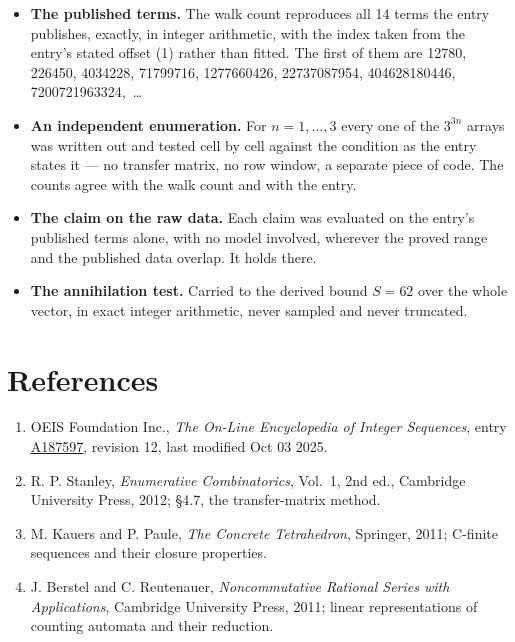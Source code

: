 \documentclass[11pt]{article}
\theoremstyle{definition}
\begin{document}
\begin{itemize}

\item {\bfseries The published terms.} The walk count reproduces all 14 terms the entry publishes, exactly, in integer arithmetic, with the index taken from the entry's stated offset (1) rather than fitted. The first of them are 12780, 226450, 4034228, 71799716, 1277660426, 22737087954, 404628180446, 7200721963324,~\dots

\item {\bfseries An independent enumeration.} For $n = 1,\dots,3$ every one of the $3^{3n}$ arrays was written out and tested cell by cell against the condition as the entry states it --- no transfer matrix, no row window, a separate piece of code. The counts agree with the walk count and with the entry.

\item {\bfseries The claim on the raw data.} Each claim was evaluated on the entry's published terms alone, with no model involved, wherever the proved range and the published data overlap. It holds there.

\item {\bfseries The annihilation test.} Carried to the derived bound $S = 62$ over the whole vector, in exact integer arithmetic, never sampled and never truncated.

\end{itemize}

\section{References}

\begin{enumerate}

\item OEIS Foundation Inc., \emph{The On-Line Encyclopedia of Integer Sequences}, entry \href{https://oeis.org/A187597}{A187597}, revision 12, last modified Oct 03 2025.

\item R. P. Stanley, \emph{Enumerative Combinatorics}, Vol.~1, 2nd ed., Cambridge University Press, 2012; \S4.7, the transfer-matrix method.

\item M. Kauers and P. Paule, \emph{The Concrete Tetrahedron}, Springer, 2011; C-finite sequences and their closure properties.

\item J. Berstel and C. Reutenauer, \emph{Noncommutative Rational Series with Applications}, Cambridge University Press, 2011; linear representations of counting automata and their reduction.

\end{enumerate}
\end{document}
